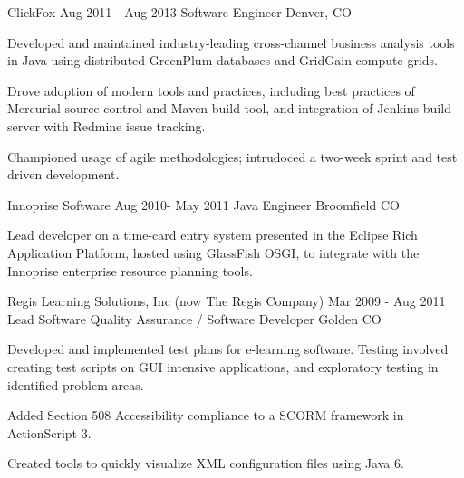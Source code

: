 \documentclass[10pt]{article}
\begin{document}
{	\job
	{ClickFox}
	{Aug 2011 - Aug 2013}
	{Software Engineer}
	{Denver, CO}
	{
	\begin{newitemize}
		\item Developed and maintained industry-leading cross-channel business analysis tools in Java using distributed GreenPlum databases and GridGain compute grids.
		\item Drove adoption of modern tools and practices, including
best practices of Mercurial source control and Maven build tool,
and integration of Jenkins build server with Redmine issue
tracking.
		\item Championed usage of agile methodologies; intrudoced a
two-week sprint and test driven development.
	\end{newitemize}
	}

	\job
	{Innoprise Software}
	{Aug 2010- May 2011}
	{Java Engineer}
	{Broomfield CO}
	{
	\begin{newitemize}
		\item Lead developer on a time-card entry system presented in
the Eclipse Rich Application Platform, hosted using GlassFish
OSGI, to integrate with the Innoprise enterprise resource
planning tools.
	\end{newitemize}
	}

	\job
	{Regis Learning Solutions, Inc (now The Regis Company)}
	{Mar 2009 - Aug 2011}
	{Lead Software Quality Assurance / Software Developer}
	{Golden CO}
	{
	\begin{newitemize}
		\item Developed and implemented test plans for e-learning
software. Testing involved creating test scripts on GUI
intensive applications, and exploratory testing in identified
problem areas.
 		\item Added Section 508 Accessibility compliance to a SCORM
framework in ActionScript 3.
		\item Created tools to quickly visualize XML configuration files
using Java 6.
	\end{newitemize}
	}
}

\end{document}
